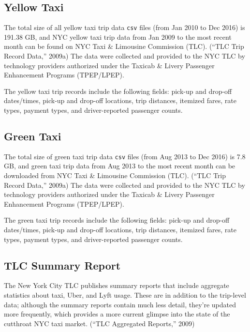 \documentclass[12pt,twoside]{reedthesis}
\theoremstyle{definition}
\theoremstyle{definition}
\theoremstyle{definition}
\theoremstyle{remark}
\begin{document}
\subsection{Yellow Taxi}\label{yellow-taxi-1}

The total size of all yellow taxi trip data \texttt{csv} files (from Jan
2010 to Dec 2016) is 191.38 GB, and NYC yellow taxi trip data from Jan
2009 to the most recent month can be found on NYC Taxi \& Limousine
Commission (TLC). (``TLC Trip Record Data,'' 2009a) The data were
collected and provided to the NYC TLC by technology providers authorized
under the Taxicab \& Livery Passenger Enhancement Programs (TPEP/LPEP).

The yellow taxi trip records include the following fields: pick-up and
drop-off dates/times, pick-up and drop-off locations, trip distances,
itemized fares, rate types, payment types, and driver-reported passenger
counts.

\subsection{Green Taxi}\label{green-taxi-1}

The total size of green taxi trip data \texttt{csv} files (from Aug 2013
to Dec 2016) is 7.8 GB, and green taxi trip data from Aug 2013 to the
most recent month can be downloaded from NYC Taxi \& Limousine
Commission (TLC). (``TLC Trip Record Data,'' 2009a) The data were
collected and provided to the NYC TLC by technology providers authorized
under the Taxicab \& Livery Passenger Enhancement Programs (TPEP/LPEP).

The green taxi trip records include the following fields: pick-up and
drop-off dates/times, pick-up and drop-off locations, trip distances,
itemized fares, rate types, payment types, and driver-reported passenger
counts.

\subsection{TLC Summary Report}\label{tlc-summary-report}

The New York City TLC publishes summary reports that include aggregate
statistics about taxi, Uber, and Lyft usage. These are in addition to
the trip-level data; although the summary reports contain much less
detail, they're updated more frequently, which provides a more current
glimpse into the state of the cutthroat NYC taxi market. (``TLC
Aggregated Reports,'' 2009)
\end{document}
